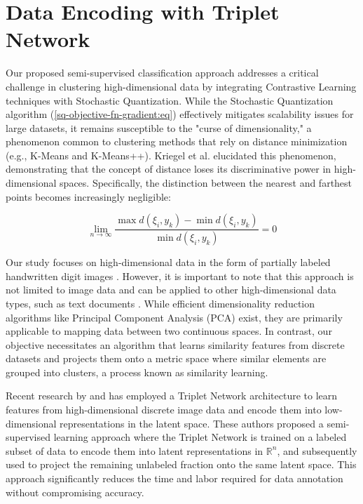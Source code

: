 \section{Data Encoding with Triplet Network}

Our proposed semi-supervised classification approach addresses a critical challenge in clustering high-dimensional data by integrating Contrastive Learning techniques \cite{Hoffer_2015,Khosla_2020} with Stochastic Quantization. While the Stochastic Quantization algorithm (\ref{sq-objective-fn-gradient:eq}) effectively mitigates scalability issues for large datasets, it remains susceptible to the "curse of dimensionality," a phenomenon common to clustering methods that rely on distance minimization (e.g., K-Means and K-Means++). Kriegel et al. \cite{Kriegel_Kröger_Zimek_2009} elucidated this phenomenon, demonstrating that the concept of distance loses its discriminative power in high-dimensional spaces. Specifically, the distinction between the nearest and farthest points becomes increasingly negligible:

\begin{equation}
    \label{dimensions-precision-ratio:eq}
    \lim_{n \to \infty} \frac{\max d(\xi_i, y_k) - \min d(\xi_i, y_k)}{\min d(\xi_i, y_k)} = 0
\end{equation}

Our study focuses on high-dimensional data in the form of partially labeled handwritten digit images \cite{lecun2010mnist}. However, it is important to note that this approach is not limited to image data and can be applied to other high-dimensional data types, such as text documents \cite{Radomirovic_2023,Widodo_2011}. While efficient dimensionality reduction algorithms like Principal Component Analysis (PCA) \cite{Abdi_Williams_2010,Deisenroth_Faisal_Ong_2020} exist, they are primarily applicable to mapping data between two continuous spaces. In contrast, our objective necessitates an algorithm that learns similarity features from discrete datasets and projects them onto a metric space where similar elements are grouped into clusters, a process known as similarity learning.

Recent research by \cite{MURASAKI_ANDO_SHIMAMURA_2022} and \cite{Turpault_Serizel_Vincent_2019} has employed a Triplet Network architecture to learn features from high-dimensional discrete image data and encode them into low-dimensional representations in the latent space. These authors proposed a semi-supervised learning approach where the Triplet Network is trained on a labeled subset of data to encode them into latent representations in $\mathbb{R}^n$, and subsequently used to project the remaining unlabeled fraction onto the same latent space. This approach significantly reduces the time and labor required for data annotation without compromising accuracy.

